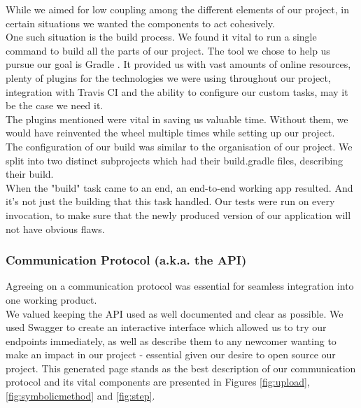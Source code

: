 \documentclass[titlepage,11pt]{article}
\begin{document}
While we aimed for low coupling among the different elements of our project, in certain situations we wanted the components to act cohesively. \\

One such situation is the build process. We found it vital to run a single command to build all the parts of our project. The tool we chose to help us pursue our goal is Gradle \cite{gradle}. It provided us with vast amounts of online resources, plenty of plugins for the technologies we were using throughout our project, integration with Travis CI and the ability to configure our custom tasks, may it be the case we need it. \\

The plugins mentioned were vital in saving us valuable time. Without them, we would have reinvented the wheel multiple times while setting up our project. \\

The configuration of our build was similar to the organisation of our project. We split into two distinct subprojects which had their build.gradle files, describing their build. \\

When the "build" task came to an end, an end-to-end working app resulted. And it's not just the building that this task handled. Our tests were run on every invocation, to make sure that the newly produced version of our application will not have obvious flaws. \\

\subsubsection{Communication Protocol (a.k.a. the API)}

Agreeing on a communication protocol was essential for seamless integration into one working product. \\

We valued keeping the API used as well documented and clear as possible. We used Swagger \cite{swagger} to create an interactive interface which allowed us to try our endpoints immediately, as well as describe them to any newcomer wanting to make an impact in our project - essential given our desire to open source our project. This generated page stands as the best description of our communication protocol and its vital components are presented in Figures \ref{fig:upload}, \ref{fig:symbolicmethod} and \ref{fig:step}. 
\end{document}

